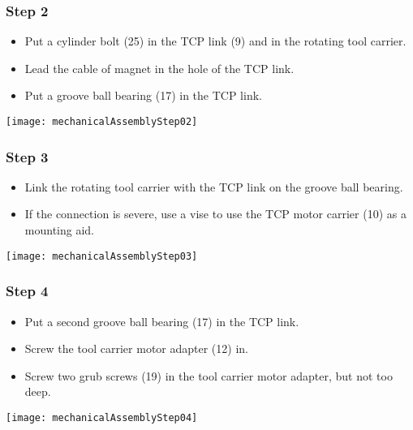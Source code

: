\subsubsection{Step 2}

\begin{minipage}[t]{0.6\textwidth}
	\begin{itemize}
		\item Put a cylinder bolt (25) in the TCP link (9) and in the rotating tool carrier.
		\item Lead the cable of magnet in the hole of the TCP link.
		\item Put a groove ball bearing (17) in the TCP link.
	\end{itemize}
\end{minipage}
\hfill
\begin{minipage}[t]{0.35\textwidth}
	\vspace{-\ht\strutbox}\texttt{[image: mechanicalAssemblyStep02]}
	\label{fig:MechanicalAssebmlyStep02} 
\end{minipage}

\subsubsection{Step 3}

\begin{minipage}[t]{0.6\textwidth}
	\begin{itemize}
		\item Link the rotating tool carrier with the TCP link on the groove ball bearing.
		\item If the connection is severe, use a vise to use the TCP motor carrier (10) as a mounting aid.
	\end{itemize}
\end{minipage}
\hfill
\begin{minipage}[t]{0.35\textwidth}
	\vspace{-\ht\strutbox}\texttt{[image: mechanicalAssemblyStep03]}
	\label{fig:MechanicalAssebmlyStep03} 
\end{minipage}

\subsubsection{Step 4}

\begin{minipage}[t]{0.6\textwidth}
	\begin{itemize}
		\item Put a second groove ball bearing (17) in the TCP link.
		\item Screw the tool carrier motor adapter (12) in.
		\item Screw two grub screws (19) in the tool carrier motor adapter, but not too deep.
	\end{itemize}
\end{minipage}
\hfill
\begin{minipage}[t]{0.35\textwidth}
	\vspace{-\ht\strutbox}\texttt{[image: mechanicalAssemblyStep04]}
	\label{fig:MechanicalAssebmlyStep04} 
\end{minipage}

